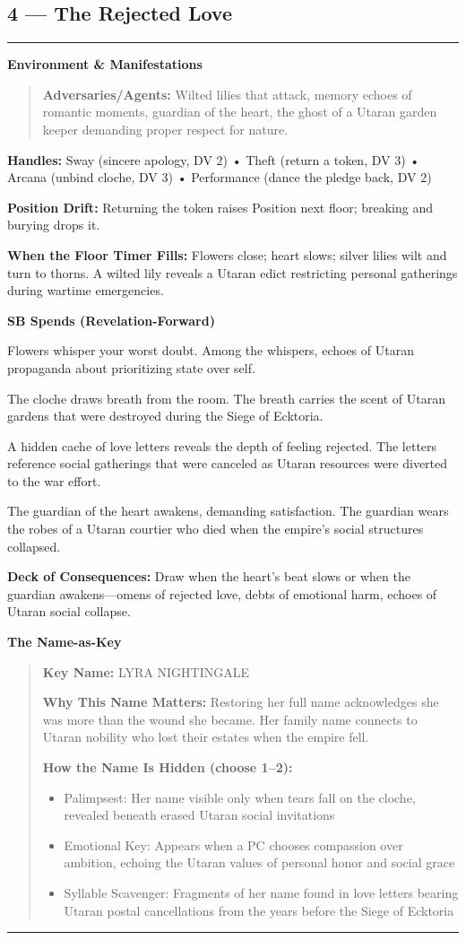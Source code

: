 \documentclass[18pt, letterpaper, twoside]{article}
\newenvironment{floorbox}[1]{%
    \begin{center}
    \begin{minipage}{0.95\textwidth}
    \subsection*{#1}
    \vspace{-0.5em}
    \rule{\textwidth}{0.5pt}
    \vspace{0.5em}
}{%
    \vspace{0.5em}
    \rule{\textwidth}{0.5pt}
    \end{minipage}
    \end{center}
}
\newenvironment{gmnote}[1]{%
    \vspace{0.5em}
    \noindent\textbf{#1}
    \begin{quote}
}{%
    \end{quote}
    \vspace{0.5em}
}
\newcommand{\handles}[1]{\noindent\textbf{Handles:} #1\par}
\newcommand{\sbitem}[2]{\item[#1 SB:] #2}
\newcommand{\deckdraw}[1]{\noindent\textbf{Deck of Consequences:} #1\par}
\newcommand{\keyname}[1]{\noindent\textbf{Key Name:} #1\par}
\newcommand{\nameimportance}[1]{\noindent\textbf{Why This Name Matters:} #1\par}
\begin{document}
\begin{floorbox}{4 --- The Rejected Love}
\begin{gmnote}{Environment \& Manifestations}
\textbf{Adversaries/Agents:} Wilted lilies that attack, memory echoes of romantic moments, guardian of the heart, the ghost of a Utaran garden keeper demanding proper respect for nature.
\end{gmnote}

\handles{Sway (sincere apology, DV 2) • Theft (return a token, DV 3) • Arcana (unbind cloche, DV 3) • Performance (dance the pledge back, DV 2)}

\textbf{Position Drift:} Returning the token raises Position next floor; breaking and burying drops it.

\textbf{When the Floor Timer Fills:} Flowers close; heart slows; silver lilies wilt and turn to thorns. A wilted lily reveals a Utaran edict restricting personal gatherings during wartime emergencies.

\textbf{SB Spends (Revelation-Forward)}
\begin{description}[leftmargin=*, style=unboxed]
    \sbitem{1}{Flowers whisper your worst doubt. Among the whispers, echoes of Utaran propaganda about prioritizing state over self.}
    \sbitem{2}{The cloche draws breath from the room. The breath carries the scent of Utaran gardens that were destroyed during the Siege of Ecktoria.}
    \sbitem{3}{A hidden cache of love letters reveals the depth of feeling rejected. The letters reference social gatherings that were canceled as Utaran resources were diverted to the war effort.}
    \sbitem{4+}{The guardian of the heart awakens, demanding satisfaction. The guardian wears the robes of a Utaran courtier who died when the empire's social structures collapsed.}
\end{description}

\deckdraw{Draw when the heart's beat slows or when the guardian awakens---omens of rejected love, debts of emotional harm, echoes of Utaran social collapse.}

\begin{gmnote}{The Name-as-Key}
\keyname{LYRA NIGHTINGALE}
\nameimportance{Restoring her full name acknowledges she was more than the wound she became. Her family name connects to Utaran nobility who lost their estates when the empire fell.}

\textbf{How the Name Is Hidden (choose 1--2):}
\begin{itemize}[leftmargin=*]
    \item Palimpsest: Her name visible only when tears fall on the cloche, revealed beneath erased Utaran social invitations
    \item Emotional Key: Appears when a PC chooses compassion over ambition, echoing the Utaran values of personal honor and social grace
    \item Syllable Scavenger: Fragments of her name found in love letters bearing Utaran postal cancellations from the years before the Siege of Ecktoria
\end{itemize}


\end{gmnote}
\end{floorbox}
\end{document}
